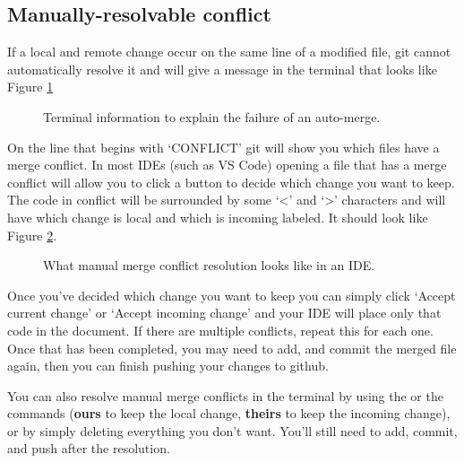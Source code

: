 \subsection{Manually-resolvable conflict}

If a local and remote change occur on the same line of a modified file, git cannot automatically resolve it and will give a message in the terminal that looks 
like Figure \ref{fig:failed_auto_merge}


\begin{figure}[h]
    \centering
    \caption{Terminal information to explain the failure of an auto-merge.}
    \label{fig:failed_auto_merge}
\end{figure}

On the line that begins with `CONFLICT' git will show you which files have a merge conflict. In most IDEs (such as VS Code) opening a file that has a merge conflict 
will allow you to click a button to decide which change you want to keep. The code in conflict will be surrounded by some `<' and `>' characters and will have
which change is local and which is incoming labeled. It should look like Figure \ref{fig:conflict_resolution}.


\begin{figure}[h]
    \centering
    \caption{What manual merge conflict resolution looks like in an IDE.}
    \label{fig:conflict_resolution}
\end{figure}

Once you've decided which change you want to keep you can simply click `Accept current change' or  `Accept incoming change' and your IDE will place only that code
in the document. If there are multiple conflicts, repeat this for each one. Once that has been completed, you may need to add, and commit the merged file again, then
you can finish pushing your changes to github.

\begin{info}
    You can also resolve manual merge conflicts in the terminal by using the  or the  commands (\textbf{ours} to keep 
    the local change, \textbf{theirs} to keep the incoming change), or by simply deleting everything you don't want. You'll still need to add, commit, 
    and push after the resolution.
\end{info}

